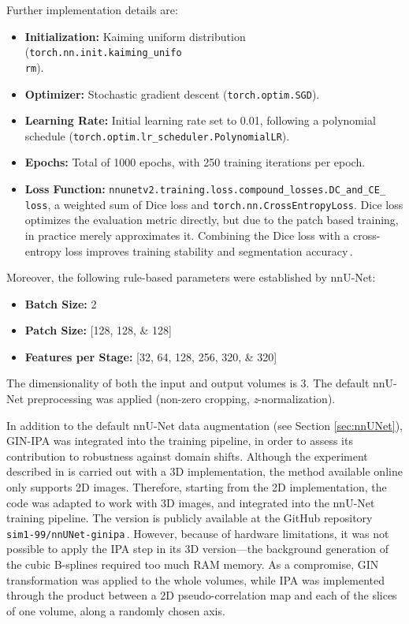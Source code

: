 Further implementation details are:
\begin{itemize}
    \item \textbf{Initialization:} Kaiming uniform distribution (\texttt{torch.nn.init.kaiming\_unifo\\
    rm}).
    \item \textbf{Optimizer:} Stochastic gradient descent (\texttt{torch.optim.SGD}).
    \item \textbf{Learning Rate:} Initial learning rate set to \num{0.01}, following a polynomial schedule (\texttt{torch.optim.lr\_scheduler.PolynomialLR}).
    \item \textbf{Epochs:} Total of \num{1000} epochs, with \num{250} training iterations per epoch.
    \item \textbf{Loss Function:} \texttt{nnunetv2.training.loss.compound\_losses.DC\_and\_CE\_\\
    loss}, a weighted sum of Dice loss and \texttt{torch.nn.CrossEntropyLoss}. Dice loss optimizes the evaluation metric directly, but due to the patch based training, in practice merely approximates it. Combining the Dice loss with a cross-entropy loss improves training stability and segmentation accuracy\,\cite{Isensee2021}.
\end{itemize}

Moreover, the following rule-based parameters were established by nnU-Net:
\begin{itemize}
    \item \textbf{Batch Size:} \num{2}
    \item \textbf{Patch Size:} [\numlist[list-final-separator = {, }]{128;128;128}]
    \item \textbf{Features per Stage:} [\numlist[list-final-separator = {, }]{32;64;128;256;320;320}]
\end{itemize}
The dimensionality of both the input and output volumes is \num{3}. The default nnU-Net preprocessing was applied (non-zero cropping, \textit{z}-normalization).

In addition to the default nnU-Net data augmentation (see Section \ref{sec:nnUNet}), GIN-IPA was integrated into the training pipeline, in order to assess its contribution to robustness against domain shifts. Although the experiment described in \cite{Ouyang2023} is carried out with a 3D implementation, the method available online only supports 2D images. Therefore, starting from the 2D implementation, the code was adapted to work with 3D images, and integrated into the nnU-Net training pipeline. The version is publicly available at the GitHub repository \texttt{sim1-99/nnUNet-ginipa}\,\cite{nnUNet-ginipa}. However, because of hardware limitations, it was not possible to apply the IPA step in its 3D version---the background generation of the cubic B-splines required too much RAM memory. As a compromise, GIN transformation was applied to the whole volumes, while IPA was implemented through the product between a 2D pseudo-correlation map and each of the slices of one volume, along a randomly chosen axis.

